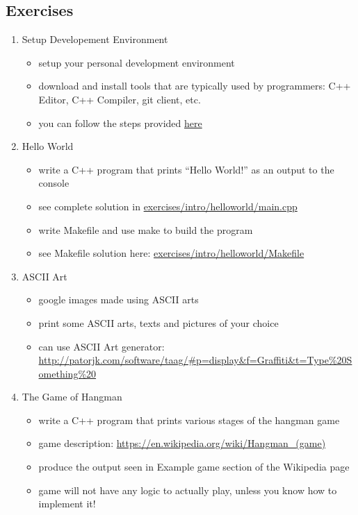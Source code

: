 \documentclass[11pt]{article}
\providecommand{\tightlist}{%
      \setlength{\itemsep}{0pt}\setlength{\parskip}{0pt}}
\begin{document}
\hypertarget{exercises}{%
\subsection{Exercises}\label{exercises}}

\begin{enumerate}
\def\labelenumi{\arabic{enumi}.}
\tightlist
\item
  Setup Developement Environment

  \begin{itemize}
  \tightlist
  \item
    setup your personal development environment
  \item
    download and install tools that are typically used by programmers:
    C++ Editor, C++ Compiler, git client, etc.
  \item
    you can follow the steps provided
    \href{https://github.com/rambasnet/DevEnvSetup}{here}
  \end{itemize}
\item
  Hello World

  \begin{itemize}
  \tightlist
  \item
    write a C++ program that prints ``Hello World!'' as an output to the
    console
  \item
    see complete solution in \url{exercises/intro/helloworld/main.cpp}
  \item
    write Makefile and use make to build the program
  \item
    see Makefile solution here:
    \href{exercises/intro/helloworld/}{exercises/intro/helloworld/Makefile}
  \end{itemize}
\item
  ASCII Art

  \begin{itemize}
  \tightlist
  \item
    google images made using ASCII arts
  \item
    print some ASCII arts, texts and pictures of your choice
  \item
    can use ASCII Art generator:
    \url{http://patorjk.com/software/taag/\#p=display\&f=Graffiti\&t=Type\%20Something\%20}
  \end{itemize}
\item
  The Game of Hangman

  \begin{itemize}
  \tightlist
  \item
    write a C++ program that prints various stages of the hangman game
  \item
    game description: \url{https://en.wikipedia.org/wiki/Hangman_(game)}
  \item
    produce the output seen in Example game section of the Wikipedia
    page
  \item
    game will not have any logic to actually play, unless you know how
    to implement it!
  \end{itemize}
\end{enumerate}
\end{document}
